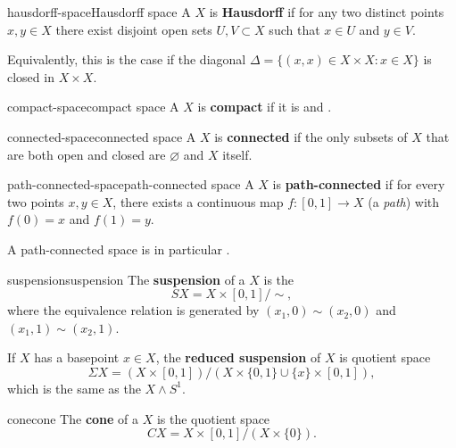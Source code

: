 \begin{topic}{hausdorff-space}{Hausdorff space}
    A  $X$ is \textbf{Hausdorff} if for any two distinct points $x, y \in X$ there exist disjoint open sets $U, V \subset X$ such that $x \in U$ and $y \in V$.
    
    Equivalently, this is the case if the diagonal $\Delta = \{ (x, x) \in X \times X : x \in X \}$ is closed in $X \times X$.
\end{topic}

\begin{topic}{compact-space}{compact space}
    A  $X$ is \textbf{compact} if it is  and .
\end{topic}

\begin{topic}{connected-space}{connected space}
    A  $X$ is \textbf{connected} if the only subsets of $X$ that are both open and closed are $\varnothing$ and $X$ itself.
\end{topic}

\begin{topic}{path-connected-space}{path-connected space}
    A  $X$ is \textbf{path-connected} if for every two points $x, y \in X$, there exists a continuous map $f : [0, 1] \to X$ (a \textit{path}) with $f(0) = x$ and $f(1) = y$.
    
    A path-connected space is in particular .
\end{topic}

\begin{topic}{suspension}{suspension}
    The \textbf{suspension} of a  $X$ is the 
    \[ S X = X \times [0, 1] / \sim{} , \]
    where the equivalence relation is generated by $(x_1, 0) \sim{} (x_2, 0)$ and $(x_1, 1) \sim{} (x_2, 1)$.
    
    If $X$ has a basepoint $x \in X$, the \textbf{reduced suspension} of $X$ is quotient space
    \[ \Sigma X = (X \times [0, 1]) / (X \times \{ 0, 1 \} \cup \{ x \} \times [0, 1]) , \]
    which is the same as the  $X \wedge S^1$.
\end{topic}

\begin{topic}{cone}{cone}
    The \textbf{cone} of a  $X$ is the quotient space
    \[ CX = X \times [0, 1] / (X \times \{ 0 \}) . \]
\end{topic}

